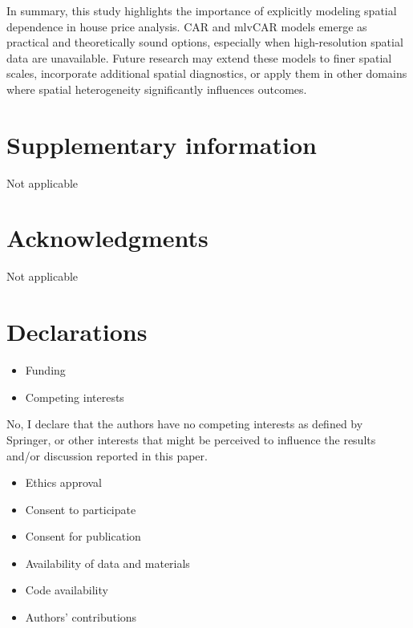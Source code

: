 \documentclass[
  default,
]{sn-jnl}
\providecommand{\tightlist}{%
  \setlength{\itemsep}{0pt}\setlength{\parskip}{0pt}}\usepackage{longtable,booktabs,array}
\begin{document}
In summary, this study highlights the importance of explicitly modeling
spatial dependence in house price analysis. CAR and mlvCAR models emerge
as practical and theoretically sound options, especially when
high-resolution spatial data are unavailable. Future research may extend
these models to finer spatial scales, incorporate additional spatial
diagnostics, or apply them in other domains where spatial heterogeneity
significantly influences outcomes.

\section*{Supplementary information}\label{supplementary-information}

Not applicable

\section*{Acknowledgments}\label{acknowledgments}

Not applicable

\section*{Declarations}\label{declarations}

\begin{itemize}
\tightlist
\item
  Funding
\item
  Competing interests
\end{itemize}

No, I declare that the authors have no competing interests as defined by
Springer, or other interests that might be perceived to influence the
results and/or discussion reported in this paper.

\begin{itemize}
\tightlist
\item
  Ethics approval
\item
  Consent to participate
\item
  Consent for publication
\item
  Availability of data and materials
\item
  Code availability
\item
  Authors' contributions
\end{itemize}
\end{document}
